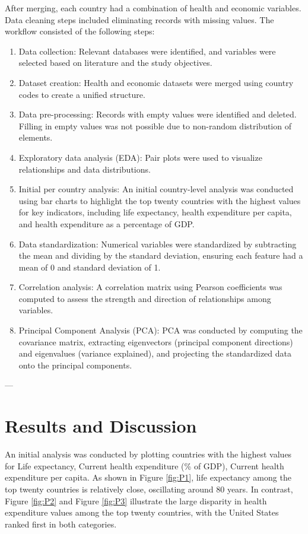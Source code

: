 \documentclass[11pt, a4paper]{article}
\begin{document}
After merging, each country had a combination of health and economic variables. Data cleaning steps included eliminating records with missing values. The workflow consisted of the following steps:

\begin{enumerate}
\item Data collection: Relevant databases were identified, and variables were selected based on literature and the study objectives.
\item Dataset creation: Health and economic datasets were merged using country codes to create a unified structure.
\item Data pre-processing: Records with empty values were identified and deleted. Filling in empty values was not possible due to non-random distribution of elements. 
\item Exploratory data analysis (EDA): Pair plots were used to visualize relationships and data distributions.
\item Initial per country analysis: An initial country-level analysis was conducted using bar charts to highlight the top twenty countries with the highest values for key indicators, including life expectancy, health expenditure per capita, and health expenditure as a percentage of GDP.
\item Data standardization: Numerical variables were standardized by subtracting the mean and dividing by the standard deviation, ensuring each feature had a mean of 0 and standard deviation of 1.
\item Correlation analysis: A correlation matrix using Pearson coefficients was computed to assess the strength and direction of relationships among variables.
\item Principal Component Analysis (PCA): PCA was conducted by computing the covariance matrix, extracting eigenvectors (principal component directions) and eigenvalues (variance explained), and projecting the standardized data onto the principal components.
\end{enumerate}

---

\section{Results and Discussion}
\label{sec:results_discussion}

An initial analysis was conducted by plotting countries with the highest values for Life expectancy, Current health expenditure (\% of GDP), Current health expenditure per capita. As shown in Figure \ref{fig:P1}, life expectancy among the top twenty countries is relatively close, oscillating around 80 years. In contrast, Figure \ref{fig:P2} and Figure \ref{fig:P3} illustrate the large disparity in health expenditure values among the top twenty countries, with the United States ranked first in both categories.
\end{document}
